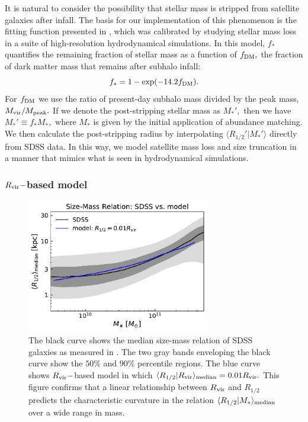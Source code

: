 \documentclass[usenatbib,usegraphicx,letterpaper]{mn2e}
\newcommand{\beq}{\begin{equation}}
\newcommand{\eeq}{\end{equation}}
\newcommand{\rhalf}{R_{1/2}}
\newcommand{\mstar}{M_{\ast}}
\newcommand{\rvir}{R_{\rm vir}}
\newcommand{\median}[2]{\langle{#1}\vert{#2}\rangle_{\rm median}}
\begin{document}
It is natural to consider the possibility that stellar mass is stripped from satellite galaxies after infall. The basis for our implementation of this phenomenon is the fitting function presented in \citet{smith_etal16}, which was calibrated by studying stellar mass loss in a suite of high-resolution hydrodynamical simulations. In this model, $f_{\ast}$ quantifies the remaining fraction of stellar mass as a function of $f_{\rm DM},$ the fraction of dark matter mass that remains after subhalo infall:
\beq
f_{\ast} = 1 - \exp(-14.2f_{\rm DM}).
\eeq
For $f_{\rm DM}$ we use the ratio of present-day subhalo mass divided by the peak mass, $M_{\rm vir}/M_{\rm peak}.$ If we denote the post-stripping stellar mass as $M_{\ast}',$ then we have $M_{\ast}'\equiv f_{\ast}M_{\ast},$ where $M_{\ast}$ is given by the initial application of abundance matching. We then calculate the post-stripping radius by interpolating $\langle\rhalf'\vert\mstar'\rangle$ directly from SDSS data. In this way, we model satellite mass loss and  size truncation in a manner that mimics what is seen in hydrodynamical simulations.


\subsubsection{$\rvir-$based model}
\label{subsubsec:rvirmodel}

\begin{figure}
\centering
\includegraphics[width=8cm]{FIGS/rvir_only_rhalf_vs_mstar_sham_model.pdf}
\caption{
The black curve shows the median size-mass relation of SDSS galaxies as measured in \citet{meert_etal15}. The two gray bands enveloping the black curve show the $50\%$ and $90\%$ percentile regions. The blue curve shows $\rvir-$based model in which $\median{\rhalf}{\rvir}=0.01\rvir.$ This figure confirms that a linear relationship between $\rvir$ and $\rhalf$ predicts the characteristic curvature in the relation $\median{\rhalf}{\mstar}$ over a wide range in mass.
}
\label{fig:scatter_plot}
\end{figure}
\end{document}
